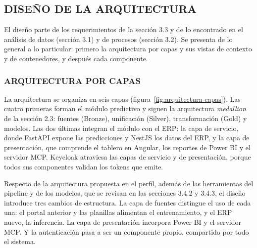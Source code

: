 \subsection{DISEÑO DE LA ARQUITECTURA}

El diseño parte de los requerimientos de la sección 3.3 y de lo encontrado en el análisis de datos (sección 3.1) y de procesos (sección 3.2). Se presenta de lo general a lo particular: primero la arquitectura por capas y sus vistas de contexto y de contenedores, y después cada componente.

\subsubsection{ARQUITECTURA POR CAPAS}

La arquitectura se organiza en seis capas (figura~\ref{fig:arquitectura-capas}). Las cuatro primeras forman el módulo predictivo y siguen la arquitectura \textit{medallion} de la sección 2.3: fuentes (Bronze), unificación (Silver), transformación (Gold) y modelos. Las dos últimas integran el módulo con el ERP: la capa de servicio, donde FastAPI expone las predicciones y NestJS los datos del ERP, y la capa de presentación, que comprende el tablero en Angular, los reportes de Power BI y el servidor MCP\@. Keycloak atraviesa las capas de servicio y de presentación, porque todos sus componentes validan los tokens que emite.

Respecto de la arquitectura propuesta en el perfil, además de las herramientas del pipeline y de los modelos, que se revisan en las secciones 3.4.2 y 3.4.3, el diseño introduce tres cambios de estructura. La capa de fuentes distingue el uso de cada una: el portal anterior y las planillas alimentan el entrenamiento, y el ERP nuevo, la inferencia. La capa de presentación incorpora Power BI y el servidor MCP\@. Y la autenticación pasa a ser un componente propio, compartido por todo el sistema.


